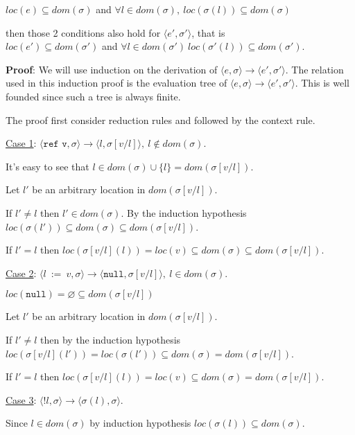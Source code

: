 \documentclass[10pt]{article}
\begin{document}
\begin{enumerate} [(a)]
    $loc(e) \subseteq dom(\sigma)$ and $\forall l \in dom(\sigma),~loc(\sigma(l)) \subseteq dom(\sigma)$

    then those 2 conditions also hold for $\langle e', \sigma' \rangle$, that is \\
    $loc(e') \subseteq dom(\sigma')$ and $\forall l \in dom(\sigma')~loc(\sigma'(l)) \subseteq dom(\sigma')$.

    \textbf{Proof}: We will use induction on the derivation of $\langle e, \sigma \rangle \rightarrow \langle e', \sigma' \rangle$. The relation used in this induction proof is the evaluation tree of $\langle e, \sigma \rangle \rightarrow \langle e', \sigma' \rangle$. This is well founded since such a tree is always finite.

    The proof first consider reduction rules and followed by the context rule.

    \underline{Case 1}: $\langle \texttt{ref v}, \sigma \rangle \rightarrow \langle l, \sigma[v/l] \rangle,~l \notin dom(\sigma)$.

    It's easy to see that $l \in dom(\sigma) \cup \{l\} = dom(\sigma[v/l])$.

    Let $l'$ be an arbitrary location in $dom(\sigma[v/l])$. 

    If $l' \neq l$ then $l' \in dom(\sigma)$. By the induction hypothesis $loc(\sigma(l')) \subseteq dom(\sigma) \subseteq dom(\sigma[v/l])$.

    If $l' = l$ then $loc(\sigma[v/l](l)) = loc(v) \subseteq dom(\sigma) \subseteq dom(\sigma[v/l]).$

    \underline{Case 2}: $\langle l~:=~v, \sigma \rangle \rightarrow \langle \texttt{null}, \sigma[v/l] \rangle,~l \in dom(\sigma)$.

    $loc(\texttt{null}) = \varnothing \subseteq dom(\sigma[v/l])$

    Let $l'$ be an arbitrary location in $dom(\sigma[v/l])$. 

    If $l' \neq l$ then by the induction hypothesis $loc(\sigma[v/l](l'))  = loc(\sigma(l')) \subseteq dom(\sigma) = dom(\sigma[v/l])$.

    If $l' = l$ then $loc(\sigma[v/l](l)) = loc(v) \subseteq dom(\sigma) = dom(\sigma[v/l]).$    

    \underline{Case 3}: $\langle !l, \sigma \rangle \rightarrow \langle \sigma(l), \sigma\rangle$.

    Since $l \in dom(\sigma)$ by induction hypothesis $loc(\sigma(l)) \subseteq dom(\sigma)$.


\end{enumerate}
\end{document}
